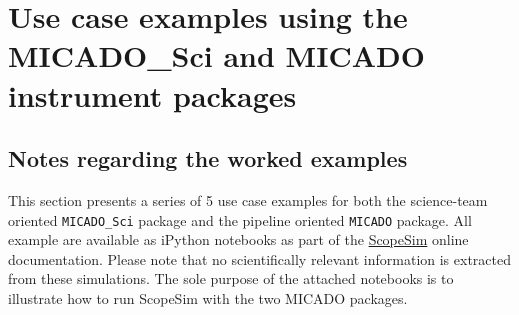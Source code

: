 

\section{Use case examples using the MICADO\_Sci and MICADO instrument packages%
  \label{use-case-examples-using-the-micado-sci-and-micado-instrument-packages}%
}


\subsection{Notes regarding the worked examples%
  \label{notes-regarding-the-worked-examples}%
}


This section presents a series of 5 use case examples for both the science-team oriented \texttt{MICADO\_Sci} package and the pipeline oriented \texttt{MICADO} package.
All example are available as iPython notebooks as part of the \href{https://scopesim.readthedocs.io/en/latest/}{ScopeSim} online documentation.
Please note that no scientifically relevant information is extracted from these simulations.
The sole purpose of the attached notebooks is to illustrate how to run ScopeSim with the two MICADO packages.

